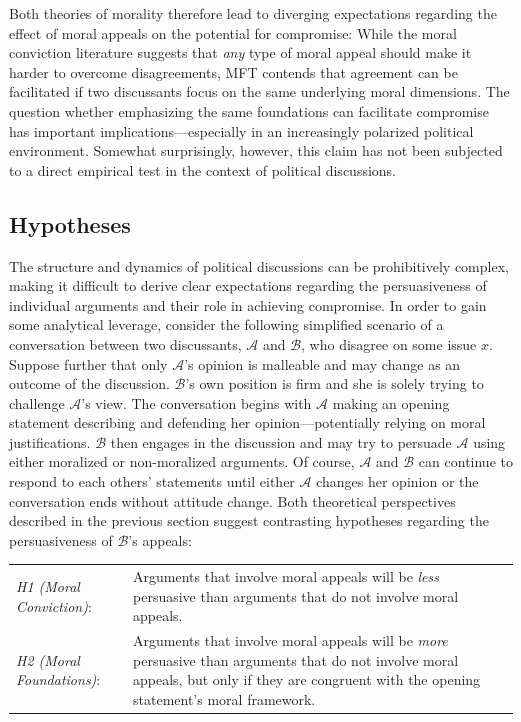 Both theories of morality therefore lead to diverging expectations regarding the effect of moral appeals on the potential for compromise: While the moral conviction literature suggests that \textit{any} type of moral appeal should make it harder to overcome disagreements, MFT contends that agreement can be facilitated if two discussants focus on the same underlying moral dimensions. The question whether emphasizing the same foundations can facilitate compromise has important implications---especially in an increasingly polarized political environment. Somewhat surprisingly, however, this claim has not been subjected to a direct empirical test in the context of political discussions.



\subsection{Hypotheses}

The structure and dynamics of political discussions can be prohibitively complex, making it difficult to derive clear expectations regarding the persuasiveness of individual arguments and their role in achieving compromise. In order to gain some analytical leverage, consider the following simplified scenario of a conversation between two discussants, $\mathcal{A}$ and $\mathcal{B}$, who disagree on some issue $x$. Suppose further that only $\mathcal{A}$'s opinion is malleable and may change as an outcome of the discussion. $\mathcal{B}$'s own position is firm and she is solely trying to challenge $\mathcal{A}$'s view. The conversation begins with $\mathcal{A}$ making an opening statement describing and defending her opinion---potentially relying on moral justifications. $\mathcal{B}$ then engages in the discussion and may try to persuade $\mathcal{A}$ using either moralized or non-moralized arguments. Of course, $\mathcal{A}$ and $\mathcal{B}$ can continue to respond to each others' statements until either $\mathcal{A}$ changes her opinion or the conversation ends without attitude change. Both theoretical perspectives described in the previous section suggest contrasting hypotheses regarding the persuasiveness of $\mathcal{B}$'s appeals:
\begin{center}\begin{tabularx}{\textwidth}{lX}
\textit{H1 (Moral Conviction)}: & Arguments that involve moral appeals will be \textit{less} persuasive than arguments that do not involve moral appeals.\\
\textit{H2 (Moral Foundations)}: & Arguments that involve moral appeals will be \textit{more} persuasive than arguments that do not involve moral appeals, but only if they are congruent with the opening statement's moral framework.
\end{tabularx}\end{center}

